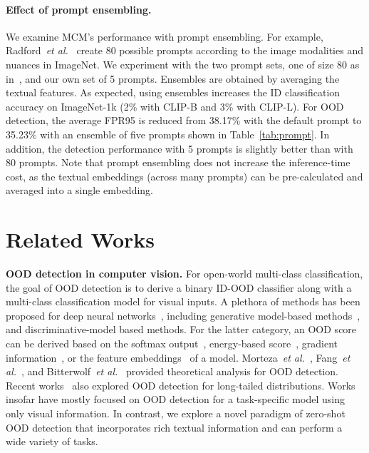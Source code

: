 \documentclass{article}
\begin{document}
\paragraph{Effect of prompt ensembling.}
We examine MCM's performance with prompt ensembling. For example, Radford~\emph{et al.}~\cite{radford2021learning} create 80 possible prompts according to the image modalities and nuances in ImageNet. We experiment with the two prompt sets, one of size 80 as in~\cite{radford2021learning}, and our own set of 5 prompts. Ensembles are obtained by averaging the textual features. As expected, using ensembles increases the ID classification accuracy on ImageNet-1k (2\% with CLIP-B and 3\% with CLIP-L). 
For OOD detection, the average FPR95 is reduced from 38.17\% with the default prompt to 35.23\%{} with an ensemble of five prompts shown in Table~\ref{tab:prompt}. In addition, the detection performance with 5 prompts is slightly better than with 80 prompts. Note that prompt ensembling does not increase the inference-time cost, as the textual embeddings (across many prompts) can be pre-calculated and averaged into a single embedding.

\section{Related Works}
\label{sec:related_works}
\noindent\textbf{OOD detection in computer vision.} For open-world multi-class classification, the goal of OOD detection is to derive a binary ID-OOD classifier along with a multi-class classification model for visual inputs. A plethora of methods has been proposed for deep neural networks~\cite{yang2021generalized}, including generative model-based methods~\cite{cai2023frequency,ge2017generative,kirichenko2020normalizing,nalisnick2019deep,neal2018open,oza2019c2ae,ren2019likelihood,serra2019input,xiao2020likelihood}, and discriminative-model based methods. For the latter category, an OOD score can be derived based on the softmax output~\cite{openmax16cvpr,2018onemore,hein2019why,hendrycks2016baseline,hsu2020generalized,huang2021mos,liang2018enhancing,yang2021scood}, energy-based score~\cite{du2022vos,liu2020energy,ming2022posterior,sun2021tone,sun2022dice,wang2021canmulti}, gradient information~\cite{huang2021importance}, or the feature embeddings~\cite{du2022siren,lee2018simple,2020gram,2021ssd,sun2022knn,tack2020csi,winkens2020contrastive} of a model. Morteza~\emph{et al.}~\cite{morteza2022provable}, Fang~\emph{et al.}~\cite{fang2022learnable}, and Bitterwolf~\emph{et al.}~\cite{bitterwolf2022breaking} provided theoretical analysis for OOD detection. Recent works~\cite{roy2022does,wang2022partial} also explored OOD detection for long-tailed distributions. Works insofar have mostly focused on OOD detection for a task-specific model using only visual information. In contrast, we explore a novel paradigm of zero-shot OOD detection that incorporates rich textual information and can perform a wide variety of tasks. 
\end{document}
